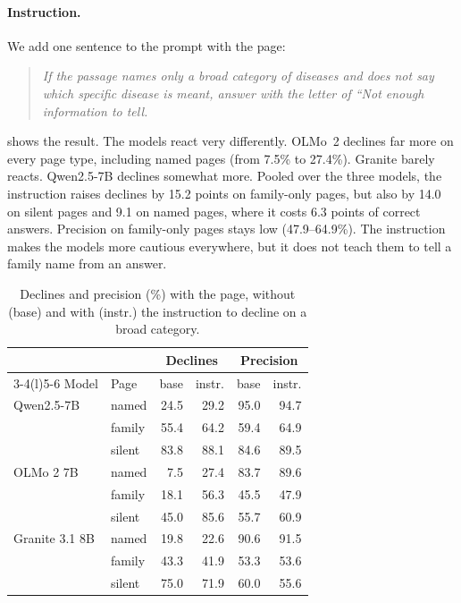 \paragraph{Instruction.}
We add one sentence to the prompt with the page:
\begin{quote}
\small\emph{If the passage names only a broad category of diseases and does not say which specific disease is meant, answer with the letter of ``Not enough information to tell.}
\end{quote}  shows the result. The models react very differently. OLMo~2 declines far more on every page type, including named pages (from 7.5\% to 27.4\%). Granite barely reacts. Qwen2.5-7B declines somewhat more. Pooled over the three models, the instruction raises declines by 15.2 points on family-only pages, but also by 14.0 on silent pages and 9.1 on named pages, where it costs 6.3 points of correct answers. Precision on family-only pages stays low (47.9--64.9\%). The instruction makes the models more cautious everywhere, but it does not teach them to tell a family name from an answer.

\begin{table}[t]
\centering
\footnotesize
\setlength{\tabcolsep}{2.4pt}
\begin{tabular}{@{}llrrrr@{}}
\toprule
 & & \multicolumn{2}{c}{Declines} & \multicolumn{2}{c}{Precision} \\
\cmidrule(lr){3-4}\cmidrule(l){5-6}
Model & Page & base & instr. & base & instr. \\
\midrule
Qwen2.5-7B & named & 24.5 & 29.2 & 95.0 & 94.7 \\
 & family & 55.4 & 64.2 & 59.4 & 64.9 \\
 & silent & 83.8 & 88.1 & 84.6 & 89.5 \\
OLMo 2 7B & named & 7.5 & 27.4 & 83.7 & 89.6 \\
 & family & 18.1 & 56.3 & 45.5 & 47.9 \\
 & silent & 45.0 & 85.6 & 55.7 & 60.9 \\
Granite 3.1 8B & named & 19.8 & 22.6 & 90.6 & 91.5 \\
 & family & 43.3 & 41.9 & 53.3 & 53.6 \\
 & silent & 75.0 & 71.9 & 60.0 & 55.6 \\
\bottomrule
\end{tabular}
\caption{Declines and precision (\%) with the page, without (base) and with (instr.) the instruction to decline on a broad category.}
\label{tab:instr}
\end{table}
